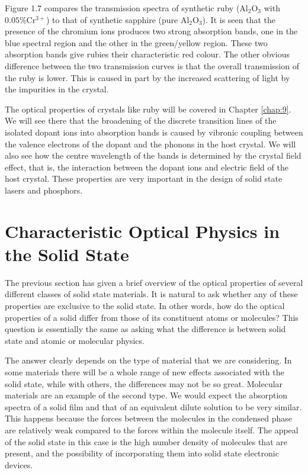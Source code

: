 \documentclass[12pt]{book}
\begin{document}
Figure 1.7 compares the transmission spectra of synthetic ruby ($\mathrm{Al_2O_3}$ with $0.05 \% \mathrm{Cr^{3+}}$) to that of synthetic sapphire (pure $\mathrm{Al_2O_3}$). It is seen that the presence of the chromium ions produces two strong absorption bands, one in the blue spectral region and the other in the green/yellow region. These two absorption bands give rubies their characteristic red colour. The other obvious difference between the two transmission curves is that the overall transmission of the ruby is lower. This is caused in part by the increased scattering of light by the impurities in the crystal.

The optical properties of crystals like ruby will be covered in Chapter \ref{chap:9}. We will see there that the broadening of the discrete transition lines of the isolated dopant ions into absorption bands is caused by vibronic coupling between the valence electrons of the dopant and the phonons in the host crystal. We will also see how the centre wavelength of the bands is determined by the crystal field effect, that is, the interaction between the dopant ions and electric field of the host crystal. These properties are very important in the design of solid state lasers and phosphors.

\section{Characteristic Optical Physics in the Solid State}

The previous section has given a brief overview of the optical properties of several different classes of solid state materials. It is natural to ask whether any of these properties are exclusive to the solid state. In other words, how do the optical properties of a solid differ from those of its constituent atoms or molecules? This question is essentially the same as asking what the difference is between solid state and atomic or molecular physics.

The answer clearly depends on the type of material that we are considering. In some materials there will be a whole range of new effects associated with the solid state, while with others, the differences may not be so great. Molecular materials are an example of the second type. We would expect the absorption spectra of a solid film and that of an equivalent dilute solution to be very similar. This happens because the forces between the molecules in the condensed phase are relatively weak compared to the forces within the molecule itself. The appeal of the solid state in this case is the high number density of molecules that are present, and the possibility of incorporating them into solid state electronic devices.
\end{document}
